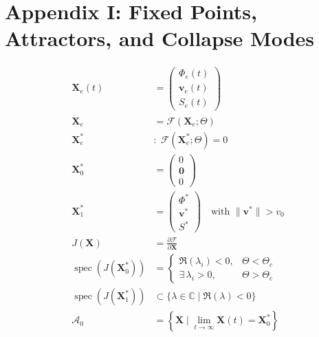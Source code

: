 \documentclass[11pt,oneside]{article}
\begin{document}
\section{Appendix I: Fixed Points, Attractors, and Collapse Modes}

\begin{align}
\mathbf{X}_e(t)
&=
\begin{pmatrix}
\Phi_e(t) \\
\mathbf{v}_e(t) \\
S_e(t)
\end{pmatrix}
\\[10pt]

\dot{\mathbf{X}}_e
&=
\mathcal{F}\!\left(\mathbf{X}_e; \Theta\right)
\\[12pt]

\mathbf{X}_e^\ast
&:\;
\mathcal{F}\!\left(\mathbf{X}_e^\ast; \Theta\right) = 0
\\[12pt]

\mathbf{X}_0^\ast
&=
\begin{pmatrix}
0 \\
\mathbf{0} \\
0
\end{pmatrix}
\\[12pt]

\mathbf{X}_1^\ast
&=
\begin{pmatrix}
\Phi^\ast \\
\mathbf{v}^\ast \\
S^\ast
\end{pmatrix}
\quad
\text{with }
\|\mathbf{v}^\ast\| > v_0
\\[14pt]

J(\mathbf{X})
&=
\frac{\partial \mathcal{F}}{\partial \mathbf{X}}
\\[10pt]

\operatorname{spec}
\left(
J(\mathbf{X}_0^\ast)
\right)
&=
\begin{cases}
\Re(\lambda_i) < 0, & \Theta < \Theta_c \\[6pt]
\exists\, \lambda_i > 0, & \Theta > \Theta_c
\end{cases}
\\[14pt]

\operatorname{spec}
\left(
J(\mathbf{X}_1^\ast)
\right)
&\subset
\{ \lambda \in \mathbb{C} \mid \Re(\lambda) < 0 \}
\\[14pt]

\mathcal{A}_0
&=
\left\{
\mathbf{X} \mid
\lim_{t \to \infty}
\mathbf{X}(t) = \mathbf{X}_0^\ast
\right\}
\\[12pt]


\end{align}
\end{document}
